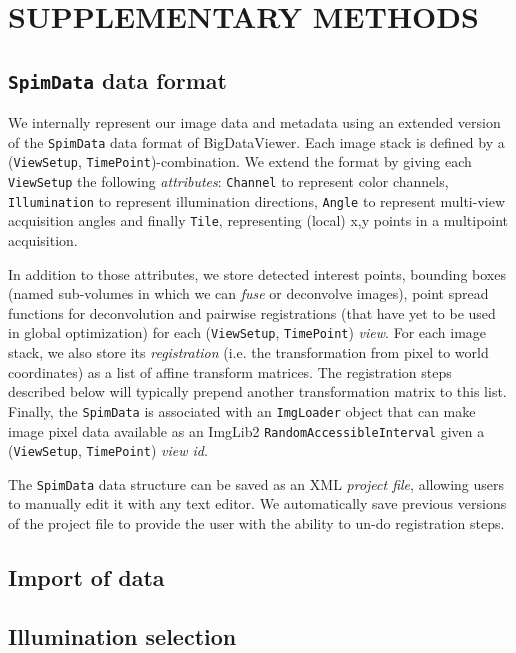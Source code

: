 \section{SUPPLEMENTARY METHODS}
\label{sec:sup-methods}

\subsection{\texttt{SpimData} data format}

We internally represent our image data and metadata using an extended version of the \texttt{SpimData} data format of BigDataViewer\cite{pietzsch2015bigdataviewer}. Each image stack is defined by a (\texttt{ViewSetup}, \texttt{TimePoint})-combination. We extend the format by giving each \texttt{ViewSetup} the following \emph{attributes}: \texttt{Channel} to represent color channels, \texttt{Illumination} to represent illumination directions, \texttt{Angle} to represent multi-view acquisition angles and finally \texttt{Tile}, representing (local) x,y points in a multipoint acquisition.

In addition to those attributes, we store detected interest points, bounding boxes (named sub-volumes in which we can \emph{fuse} or deconvolve images), point spread functions for deconvolution and pairwise registrations (that have yet to be used in global optimization) for each (\texttt{ViewSetup}, \texttt{TimePoint}) \emph{view}. For each image stack, we also store its \emph{registration} (i.e. the transformation from pixel to world coordinates) as a list of affine transform matrices. The registration steps described below will typically prepend another transformation matrix to this list. Finally, the \texttt{SpimData} is associated with an \texttt{ImgLoader} object that can make image pixel data available as an ImgLib2 \texttt{RandomAccessibleInterval} given a  (\texttt{ViewSetup}, \texttt{TimePoint}) \emph{view id}.

The \texttt{SpimData} data structure can be saved as an XML \emph{project file}, allowing users to manually edit it with any text editor. We automatically save previous versions of the project file to provide the user with the ability to un-do registration steps.

\subsection{Import of data}

\subsection{Illumination selection}

